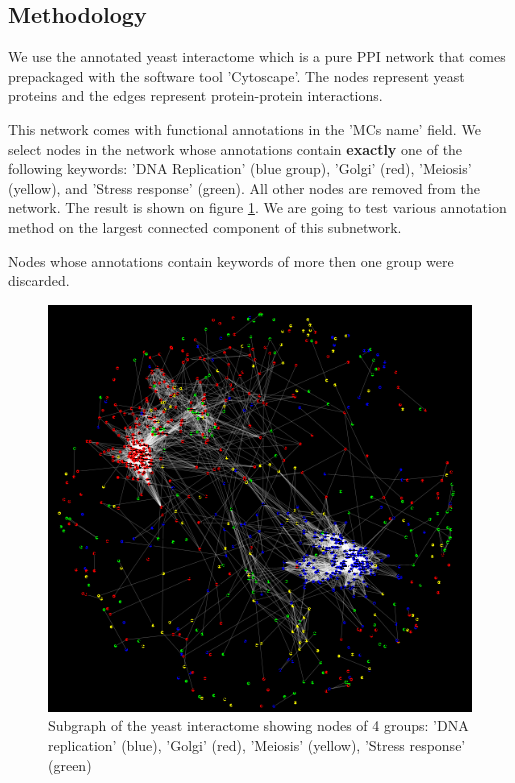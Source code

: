 \documentclass[a4paper,10pt]{article}
\theoremstyle{definition}
\theoremstyle{remark}
\theoremstyle{plain}
\begin{document}
\subsection{Methodology}
We use the annotated yeast interactome which is a pure PPI network that comes
prepackaged with the
software tool 'Cytoscape'. The nodes represent yeast proteins and the edges
represent protein-protein interactions.

This network comes with functional annotations in the 'MCs name' field. We
select nodes in the network whose annotations contain \textbf{exactly} one
of the following
keywords:  'DNA Replication' (blue group), 'Golgi' (red), 'Meiosis' (yellow),
and 'Stress response' (green). All other nodes are removed from the network.
The result is shown on figure \ref{fig:yeast_subgraph_4groups}. We are going to
test various annotation method on the largest connected component of this
subnetwork.

Nodes whose annotations contain keywords of more then one group were discarded.

\begin{figure}
\begin{framed}
\centering
\includegraphics[width=\textwidth]{yeastsubgraph_4_groups_colorcode.png}
\caption{Subgraph of the yeast interactome showing nodes of 4 groups: 'DNA
replication' (blue), 'Golgi' (red), 'Meiosis' (yellow), 'Stress response'
(green)}
\label{fig:yeast_subgraph_4groups}
\end{framed}
\end{figure}
\end{document}
